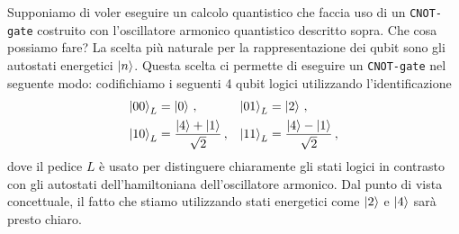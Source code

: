 \begin{esempio}
    Supponiamo di voler eseguire un calcolo quantistico che faccia uso di un \texttt{CNOT-gate} costruito con l'oscillatore armonico quantistico descritto sopra. Che cosa possiamo fare? La scelta più naturale per la rappresentazione dei qubit sono gli autostati energetici $\ket n$. Questa scelta ci permette di eseguire un \texttt{CNOT-gate} nel seguente modo: codifichiamo i seguenti 4 qubit logici utilizzando l'identificazione
    \begin{equation}\label{eq:cnot-qho}
        \begin{aligned}
            \ket{00}_L &= \ket{0} \, , &\ket{01}_L &= \ket{2} \, ,\\
            \ket{10}_L &= \frac{\ket{4}+\ket{1}}{\sqrt 2} \, , &\ket{11}_L &= \frac{\ket{4}-\ket{1}}{\sqrt 2} \, ,
        \end{aligned}
    \end{equation}
    \noindent dove il pedice $L$ è usato per distinguere chiaramente gli stati logici in contrasto con gli autostati dell'hamiltoniana dell'oscillatore armonico. Dal punto di vista concettuale, il fatto che stiamo utilizzando stati energetici come $\ket 2$ e $\ket 4$ sarà presto chiaro.
    

\end{esempio}
